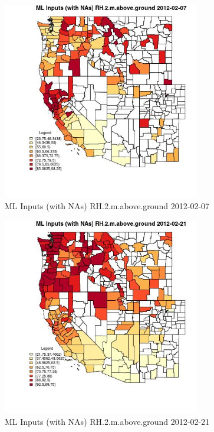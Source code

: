 \begin{figure} 
\centering  
\includegraphics[width=0.77\textwidth]{Code_Outputs/Report_ML_input_PM25_Step4_part_f_de_duplicated_aves_prioritize_24hr_obswNAs_CountyRH2mabovegroundMean2012-02-07.jpg} 
\caption{\label{fig:Report_ML_input_PM25_Step4_part_f_de_duplicated_aves_prioritize_24hr_obswNAsCountyRH2mabovegroundMean2012-02-07}ML Inputs (with NAs) RH.2.m.above.ground 2012-02-07} 
\end{figure} 
 

\begin{figure} 
\centering  
\includegraphics[width=0.77\textwidth]{Code_Outputs/Report_ML_input_PM25_Step4_part_f_de_duplicated_aves_prioritize_24hr_obswNAs_CountyRH2mabovegroundMean2012-02-21.jpg} 
\caption{\label{fig:Report_ML_input_PM25_Step4_part_f_de_duplicated_aves_prioritize_24hr_obswNAsCountyRH2mabovegroundMean2012-02-21}ML Inputs (with NAs) RH.2.m.above.ground 2012-02-21} 
\end{figure} 
 

